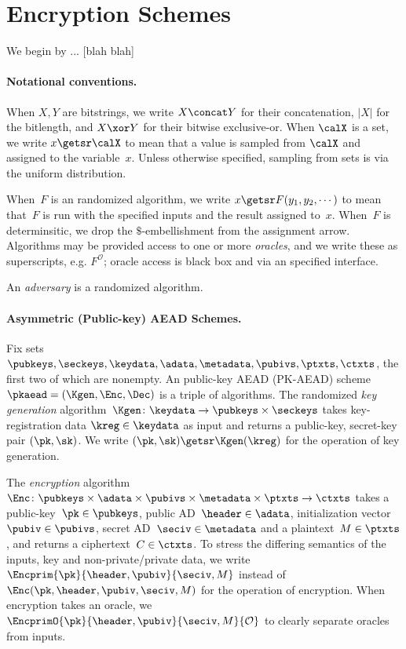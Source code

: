 \section{Encryption Schemes}
\label{sec:prelims}
\label{sec:encryption}
We begin by ... [blah blah]

\paragraph{Notational conventions. }When $X,Y$ are bitstrings, we write $X \concat Y$ for their concatenation, $|X|$ for the bitlength, and $X\xor Y$ for their bitwise exclusive-or.  When $\calX$ is a set, we write $x \getsr \calX$ to mean that a value is sampled from $\calX$ and assigned to the variable~$x$.  Unless otherwise specified, sampling from sets is via the uniform distribution.

When~$F$ is an randomized algorithm, we write $x \getsr F(y_1,y_2,\cdots)$ to mean that~$F$ is run with the specified inputs and the result assigned to~$x$.  When~$F$ is determinsitic, we drop the $\$$-embellishment from the assignment arrow.  Algorithms may be provided access to one or more \emph{oracles}, and we write these as superscripts, e.g. $F^{\mathcal{O}}$; oracle access is black box and via an specified interface.  

An \emph{adversary} is a randomized algorithm.

\paragraph{Asymmetric (Public-key) AEAD Schemes. }
Fix sets $\pubkeys, \seckeys, \keydata, \adata, \metadata, \pubivs, \ptxts,
\ctxts$, the first two of which are nonempty.  An public-key AEAD
(PK-AEAD) scheme $\pkaead=(\Kgen,\Enc,\Dec)$ is a triple of algorithms.  The randomized \emph{key generation} algorithm~$\Kgen\colon\keydata\to\pubkeys\times\seckeys$ takes key-registration data $\kreg \in \keydata$ as input and returns a public-key, secret-key pair $(\pk,\sk)$.  We write $(\pk,\sk)\getsr\Kgen(\kreg)$ for the operation of key generation. 

The \emph{encryption} algorithm $\Enc \colon \pubkeys \times \adata \times \pubivs \times \metadata \times \ptxts \to \ctxts$ takes a public-key~$\pk\in\pubkeys$, public AD~$\header \in \adata$, initialization vector~$\pubiv \in \pubivs$, secret AD~$\seciv \in \metadata$ and a plaintext~$M \in \ptxts$, and returns a ciphertext~$C \in \ctxts$. 
To stress the differing semantics of the inputs, key and non-private/private data, we write $\Encprim{\pk}{\header,\pubiv}{\seciv,M}$ instead of $\Enc(\pk,\header,\pubiv,\seciv,M)$ for the operation of encryption.  When encryption takes an oracle, we $\EncprimO{\pk}{\header,\pubiv}{\seciv,M}{\mathcal{O}}$ to clearly separate oracles from inputs.

